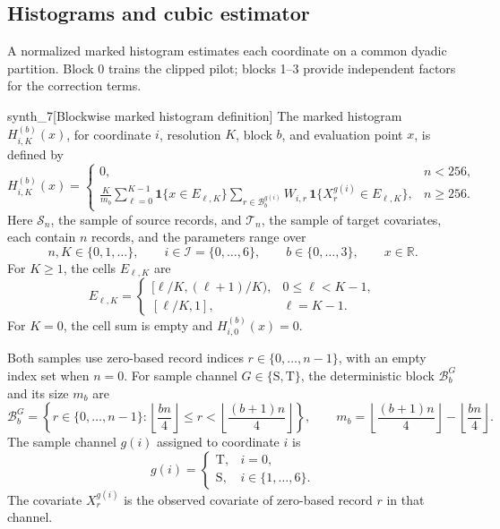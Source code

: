 \subsection{Histograms and cubic estimator}

A normalized marked histogram estimates each coordinate on a common dyadic partition. Block 0 trains the clipped pilot; blocks 1--3 provide independent factors for the correction terms.

\begin{definitionv}{synth_7}[Blockwise marked histogram definition]
The marked histogram \(H_{i,K}^{(b)}(x)\), for coordinate \(i\), resolution \(K\), block \(b\), and evaluation point \(x\), is defined by
\[
H_{i,K}^{(b)}(x)=
\begin{cases}
0,&n<256,\\[2mm]
\displaystyle
\frac{K}{m_b}
\sum_{\ell=0}^{K-1}
\mathbf 1\{x\in E_{\ell,K}\}
\sum_{r\in\mathcal B_b^{g(i)}}
W_{i,r}\,
\mathbf 1\{X_r^{g(i)}\in E_{\ell,K}\},
&n\ge256.
\end{cases}
\]
Here \(\mathcal S_n\), the sample of source records, and \(\mathcal T_n\), the sample of target covariates, each contain \(n\) records, and the parameters range over
\[
n,K\in\{0,1,\ldots\},\qquad
i\in\mathcal I=\{0,\ldots,6\},\qquad
b\in\{0,\ldots,3\},\qquad
x\in\mathbb R.
\]
For \(K\ge1\), the cells \(E_{\ell,K}\) are
\[
E_{\ell,K}=
\begin{cases}
[\ell/K,(\ell+1)/K),&0\le\ell<K-1,\\
[\ell/K,1],&\ell=K-1.
\end{cases}
\]
For \(K=0\), the cell sum is empty and \(H_{i,0}^{(b)}(x)=0\).

Both samples use zero-based record indices \(r\in\{0,\ldots,n-1\}\), with an empty index set when \(n=0\). For sample channel \(G\in\{\mathrm S,\mathrm T\}\), the deterministic block \(\mathcal B_b^G\) and its size \(m_b\) are
\[
\mathcal B_b^G
=
\left\{
r\in\{0,\ldots,n-1\}:
\left\lfloor\frac{bn}{4}\right\rfloor
\le r<
\left\lfloor\frac{(b+1)n}{4}\right\rfloor
\right\},
\qquad
m_b=
\left\lfloor\frac{(b+1)n}{4}\right\rfloor
-
\left\lfloor\frac{bn}{4}\right\rfloor.
\]
The sample channel \(g(i)\) assigned to coordinate \(i\) is
\[
g(i)=
\begin{cases}
\mathrm T,&i=0,\\
\mathrm S,&i\in\{1,\ldots,6\}.
\end{cases}
\]
The covariate \(X_r^{g(i)}\) is the observed covariate of zero-based record \(r\) in that channel.


\end{definitionv}
